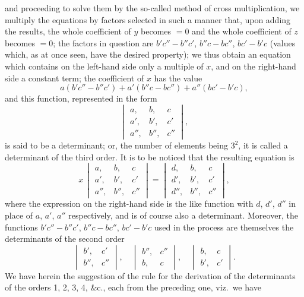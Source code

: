 \documentclass[12pt,a4paper,oneside]{book}
\begin{document}
\newpage
and proceeding to solve them by the so-called method of cross multiplication, we multiply the equations by factors selected in such a manner that, upon adding the results, the whole coefficient of $y$ becomes $=0$ and the whole coefficient of $z$ becomes $=0$; the factors in question are $b'c''-b''c'$, $b''c-bc''$, $bc'-b'c$ (values which, as at once seen, have the desired property); we thus obtain an equation which contains on the left-hand side only a multiple of $x$, and on the right-hand side a constant term; the coefficient of $x$ has the value
\[
a(b'c''-b''c') + a'(b''c-bc'') + a''(bc'-b'c),
\]
and this function, represented in the form
\[
\begin{vmatrix} a, & b, & c \\ a', & b', & c' \\ a'', & b'', & c'' \end{vmatrix},
\]
is said to be a determinant; or, the number of elements being $3^{2}$, it is called a determinant of the third order. It is to be noticed that the resulting equation is
\[
x\,\begin{vmatrix} a, & b, & c \\ a', & b', & c' \\ a'', & b'', & c'' \end{vmatrix} = \begin{vmatrix} d, & b, & c \\ d', & b', & c' \\ d'', & b'', & c'' \end{vmatrix},
\]
where the expression on the right-hand side is the like function with $d$, $d'$, $d''$ in place of $a$, $a'$, $a''$ respectively, and is of course also a determinant. Moreover, the functions $b'c''-b''c'$, $b''c-bc''$, $bc'-b'c$ used in the process are themselves the determinants of the second order
\[
\begin{vmatrix} b', & c' \\ b'', & c'' \end{vmatrix},\quad \begin{vmatrix} b'', & c'' \\ b, & c \end{vmatrix},\quad \begin{vmatrix} b, & c \\ b', & c' \end{vmatrix}.
\]
We have herein the suggestion of the rule for the derivation of the determinants of the orders 1, 2, 3, 4, \&c., each from the preceding one, viz.\ we have
\end{document}

